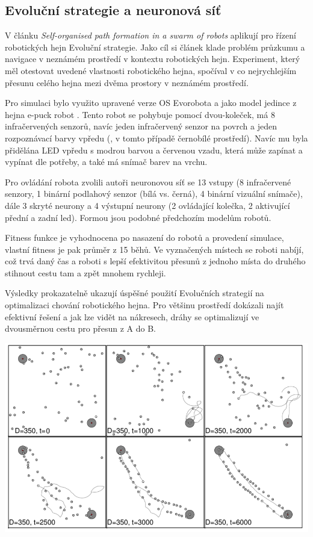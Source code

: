 \subsection{Evoluční strategie a neuronová síť}
V článku \textit{Self-organised path formation in a swarm of robots} \citep{sperati2011self} aplikují pro řízení robotických hejn Evoluční strategie. Jako cíl si článek klade problém průzkumu a navigace v neznámém prostředí v kontextu robotických hejn. Experiment, který měl otestovat uvedené vlastnosti robotického hejna, spočíval v co nejrychlejším přesunu celého hejna mezi dvěma prostory v neznámém prostředí. 
\par 
Pro simulaci bylo využito upravené verze OS Evorobota a jako model jedince z hejna e-puck robot \citep{mondada2009puck}. Tento robot se pohybuje pomocí dvou-koleček, má 8 infračervených senzorů, navíc jeden infračervený senzor na povrch a jeden rozpoznávací barvy vpředu (, v tomto případě černobílé prostředí). Navíc mu byla přidělána LED vpředu s modrou barvou a červenou vzadu, která může zapínat a vypínat dle potřeby, a také má snímač barev na vrchu. 
\par
Pro ovládání robota zvolili autoři neuronovou síť se 13 vstupy (8 infračervené senzory, 1 binární podlahový senzor (bílá vs. černá), 4 binární vizuální snímače), dále 3 skryté neurony a 4 výstupní neurony (2 ovládající kolečka, 2 aktivující přední a zadní led). Formou jsou podobné předchozím modelům robotů. 
\par
Fitness funkce je vyhodnocena po nasazení do robotů a provedení simulace, vlastní fitness je pak průměr z 15 běhů. Ve vyznačených místech se roboti nabíjí, což trvá daný čas a roboti s lepší efektivitou přesunů z jednoho místa do druhého stihnout cestu tam a zpět mnohem rychleji.
\par 
Výsledky prokazatelně ukazují úspěšné použití Evolučních strategií na optimalizaci chování robotického hejna. Pro většinu prostředí dokázali najít efektivní řešení a jak lze vidět na nákresech, dráhy se optimalizují ve dvousměrnou cestu pro přesun z A do B.
\par
\begin{center}
    \includegraphics[scale=0.8]{../img/drahyEs.png}
\end{center}


